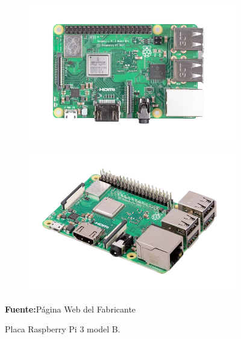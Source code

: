 \begin{itemize}
\begin{figure}[H]
\centering
     \begin{subfigure}[b]{0.45\textwidth}
         \centering
         \includegraphics[width=\textwidth]{Imagenes/cap3/raspberry_1.png}
     \end{subfigure}
\hfill
     \begin{subfigure}[b]{0.45\textwidth}
         \centering
         \includegraphics[width=\textwidth]{Imagenes/cap3/raspberry_2.png}
     \end{subfigure}
\caption[Placa Raspberry Pi 3 model B]{Placa Raspberry Pi 3 model B.}
\textbf{Fuente:}P\'agina Web del Fabricante\cite{atlas_dissolved_DO}
\label{fig:raspberry}
\hfill
\end{figure}


\end{itemize}
